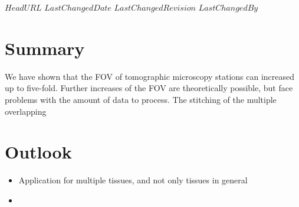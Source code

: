 \svnidlong
{$HeadURL$}
{$LastChangedDate$}
{$LastChangedRevision$}
{$LastChangedBy$}

\begin{center}
\end{center}

\section{Summary}
We have shown that the FOV of tomographic microscopy stations can increased up to five-fold. Further increases of the FOV are theoretically possible, but face problems with the amount of data to process. The stitching of the multiple overlapping 




\section{Outlook}

\begin{itemize}
	\item Application for multiple tissues, and not only tissues in general
	\item 
\end{itemize}